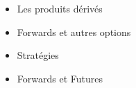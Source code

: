 \maketitle 
\vspace{50px}
\begin{center}
\begin{minipage}[c]{7.5cm}
    \begin{itemize}
        \LARGE
        \item[\color{black}\ding{235}] Les produits dérivés 
        \item[\color{black}  \ding{235}] Forwards et autres options
        \item[\color{purple} \ding{235}] Stratégies
        \item[\color{orange} \ding{235}] Forwards et Futures
    \end{itemize}
\end{minipage}
\end{center}